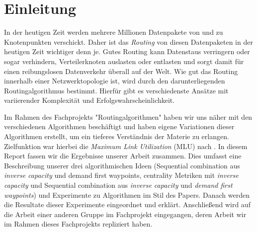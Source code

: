 \documentclass[sigconf, nonacm, review]{acmart}
\begin{document}


\received[\"uberarbeitet]{\textcolor{red}{ausstehend}}

\maketitle

\section{Einleitung}
In der heutigen Zeit werden mehrere Millionen Datenpakete von und zu Knotenpunkten verschickt.
Daher ist das \emph{Routing} von diesen Datenpaketen in der heutigen Zeit wichtiger denn je.
Gutes Routing kann Datenstaus verringern oder sogar verhindern, Verteilerknoten auslasten oder entlasten 
und sorgt damit f\"ur einen reibungslosen Datenverkehr \"uberall auf der Welt.
Wie gut das Routing innerhalb einer Netzwerktopologie ist, 
wird durch den darunterliegenden Routingalgorithmus bestimmt.
Hierf\"ur gibt es verschiedenste Ans\"atze mit variierender Komplexit\"at und Erfolgswahrscheinlichkeit.

Im Rahmen des Fachprojekts "Routingalgorithmen" haben wir uns n\"aher mit den verschiedenen Algorithmen besch\"aftigt 
und haben eigene Variationen dieser Algorithmen erstellt,
um ein tieferes Verst\"andnis der Materie zu erlangen.
Zielfunktion war hierbei die \emph{Maximum Link Utilization} (MLU) nach \cite{foerster2021}.
In diesem Report fassen wir die Ergebnisse unserer Arbeit zusammen.
Dies umfasst eine Beschreibung unserer drei algorithmischen Ideen (Sequential combination aus \emph{inverse capacity} und demand
first waypoints, centrality Metriken mit \emph{inverse capacity} und Sequential combination aus \emph{inverse capacity} und \emph{demand first waypoints})
und Experimente zu Algorithmen im Stil des Papers\cite{foerster2021}.
Danach werden die Resultate dieser Experimente eingeordnet und erkl\"art.
Anschließend wird auf die Arbeit einer anderen Gruppe im Fachprojekt eingegangen, deren Arbeit wir im Rahmen dieses Fachprojekts repliziert haben.


\end{document}
